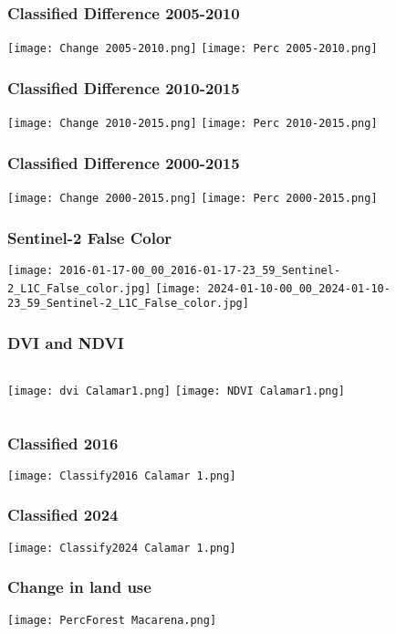 \documentclass{beamer}
\begin{document}
\begin{frame}
\frametitle{Classified Difference 2005-2010} 
\centering
\texttt{[image: Change 2005-2010.png]}
\texttt{[image: Perc 2005-2010.png]}
\end{frame}

\begin{frame}
\frametitle{Classified Difference 2010-2015} 
\centering
\texttt{[image: Change 2010-2015.png]}
\texttt{[image: Perc 2010-2015.png]}
\end{frame}

\begin{frame}
\frametitle{Classified Difference 2000-2015} 
\centering
\texttt{[image: Change 2000-2015.png]}
\texttt{[image: Perc 2000-2015.png]}
\end{frame}

\begin{frame}
\frametitle{Sentinel-2 False Color}
\centering
\texttt{[image: 2016-01-17-00\_00\_2016-01-17-23\_59\_Sentinel-2\_L1C\_False\_color.jpg]}
\texttt{[image: 2024-01-10-00\_00\_2024-01-10-23\_59\_Sentinel-2\_L1C\_False\_color.jpg]}
\end{frame}

\begin{frame}
\frametitle{DVI and NDVI}
\begin{columns}
        \centering
        \texttt{[image: dvi Calamar1.png]}
        \centering
        \texttt{[image: NDVI Calamar1.png]}
    \end{columns}
\end{frame}

\begin{frame}
\frametitle{Classified 2016}
\centering
\texttt{[image: Classify2016 Calamar 1.png]}
\end{frame}

\begin{frame}
\frametitle{Classified 2024}
\centering
\texttt{[image: Classify2024 Calamar 1.png]}
\end{frame}

\begin{frame}
\frametitle{Change in land use}
\centering
\texttt{[image: PercForest Macarena.png]}
\end{frame}
\end{document}
